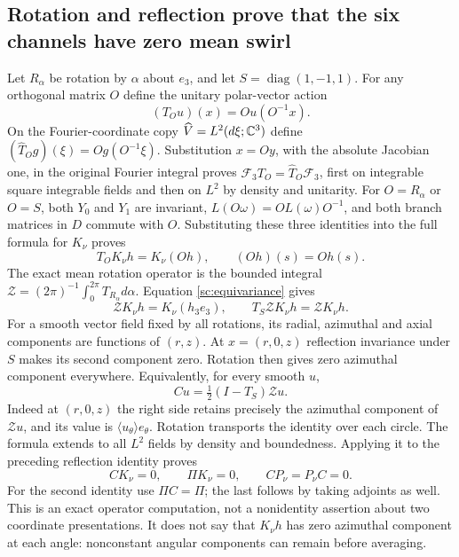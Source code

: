 \subsection*{Rotation and reflection prove that the six channels have zero mean swirl}

Let $R_\alpha$ be rotation by $\alpha$ about $e_3$, and let
$S=\operatorname{diag}(1,-1,1)$. For any orthogonal matrix $O$ define
the unitary polar-vector action
\[
 (T_Ou)(x)=O u(O^{-1}x).
\]
On the Fourier-coordinate copy $\widehat V=L^2(d\xi;\mathbb C^3)$ define
$(\widehat T_Og)(\xi)=O g(O^{-1}\xi)$.
Substitution $x=Oy$, with the absolute Jacobian one, in the original
Fourier integral proves
$\mathcal F_3T_O=\widehat T_O\mathcal F_3$, first on integrable square
integrable fields and then on $L^2$ by density and unitarity.
For $O=R_\alpha$ or $O=S$, both $Y_0$ and $Y_1$ are invariant,
$L(O\omega)=O L(\omega)O^{-1}$, and both branch matrices in $D$
commute with $O$. Substituting these three identities into the full
formula for $K_\nu$ proves
\begin{equation}
 T_OK_\nu h=K_\nu(Oh),
 \qquad (Oh)(s)=O h(s).
 \label{sc:equivariance}
\end{equation}
The exact mean rotation operator is the bounded integral
$\mathcal Z=(2\pi)^{-1}\int_0^{2\pi}T_{R_\alpha}d\alpha$.
Equation \eqref{sc:equivariance} gives
\[
 \mathcal ZK_\nu h=K_\nu(h_3e_3),
 \qquad T_S\mathcal ZK_\nu h=\mathcal ZK_\nu h.
\]
For a smooth vector field fixed by all rotations, its radial,
azimuthal and axial components are functions of $(r,z)$.
At $x=(r,0,z)$ reflection invariance under $S$ makes its second
component zero. Rotation then gives zero azimuthal component
everywhere. Equivalently, for every smooth $u$,
\begin{equation}
 C u=\tfrac12(I-T_S)\mathcal Z u.
 \label{sc:Cformula}
\end{equation}
Indeed at $(r,0,z)$ the right side retains precisely the azimuthal
component of $\mathcal Zu$, and its value is
$\langle u_\theta\rangle e_\theta$. Rotation transports the identity
over each circle. The formula extends to all $L^2$ fields by density
and boundedness. Applying it to the preceding reflection identity proves
\begin{equation}
 CK_\nu=0,\qquad \Pi K_\nu=0,
 \qquad CP_\nu=P_\nu C=0.
 \label{sc:annihilation}
\end{equation}
For the second identity use $\Pi C=\Pi$; the last follows by taking
adjoints as well. This is an exact operator computation, not a
nonidentity assertion about two coordinate presentations.
It does not say that $K_\nu h$ has zero azimuthal component at each
angle: nonconstant angular components can remain before averaging.

